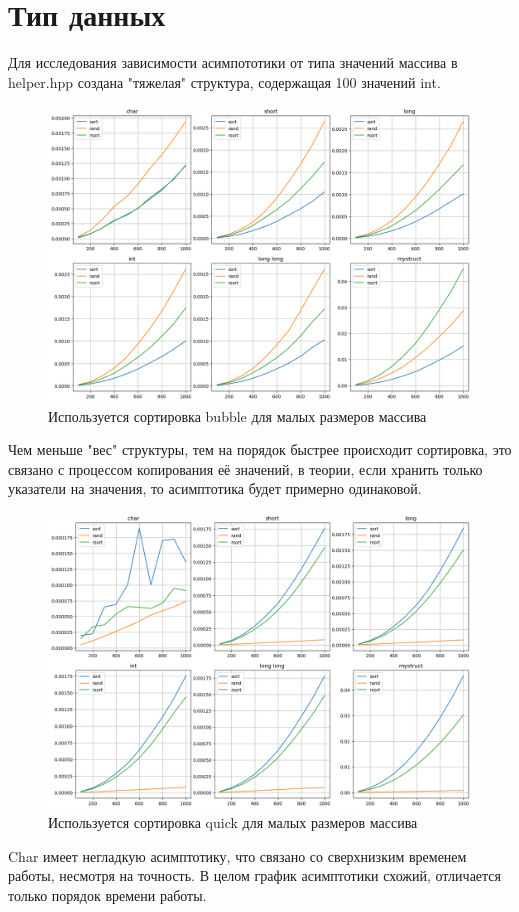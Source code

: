\documentclass[12pt,onecolumn]{article}
\begin{document}
\section{Тип данных}
Для исследования зависимости асимпототики от типа значений массива в helper.hpp создана "тяжелая" структура, содержащая 100 значений int. 
\begin{figure}[H]
    \centering
    \includegraphics[width=1\textwidth]{Assets/graph7.png}
    \caption{Используется сортировка bubble для малых размеров массива}
\end{figure}
Чем меньше "вес" структуры, тем на порядок быстрее происходит сортировка, это связано с процессом копирования её значений, в теории, если хранить только указатели на значения, то асимптотика будет примерно одинаковой. 
\begin{figure}[H]
    \centering
    \includegraphics[width=1\textwidth]{Assets/graph8.png}
    \caption{Используется сортировка quick для малых размеров массива}
\end{figure}
Char имеет негладкую асимптотику, что связано со сверхнизким временем работы, несмотря на точность. В целом график асимптотики схожий, отличается только порядок времени работы.
\end{document}
